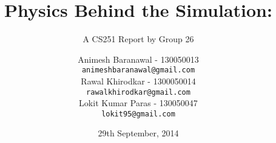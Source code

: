 \title{ Physics Behind the Simulation: }
\subtitle{ A CS251 Report by Group 26 }

\author{
	Animesh Baranawal - 130050013 \\
	\texttt {animeshbaranawal@gmail.com} \\
	Rawal Khirodkar - 1300050014 \\
	\texttt {rawalkhirodkar@gmail.com} \\
	Lokit Kumar Paras - 130050047 \\
	\texttt {lokit95@gmail.com} 
}

\date{ 29th September, 2014 }

\begin{frame}
  \titlepage
\end{frame}
